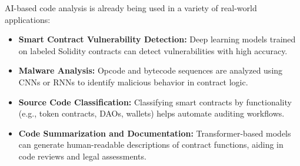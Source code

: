 AI-based code analysis is already being used in a variety of real-world applications:

\begin{itemize}
    \item \textbf{Smart Contract Vulnerability Detection:} Deep learning models trained on labeled Solidity contracts can detect vulnerabilities with high accuracy.
    
    \item \textbf{Malware Analysis:} Opcode and bytecode sequences are analyzed using CNNs or RNNs to identify malicious behavior in contract logic.
    
    \item \textbf{Source Code Classification:} Classifying smart contracts by functionality (e.g., token contracts, DAOs, wallets) helps automate auditing workflows.
    
    \item \textbf{Code Summarization and Documentation:} Transformer-based models can generate human-readable descriptions of contract functions, aiding in code reviews and legal assessments.
\end{itemize}

